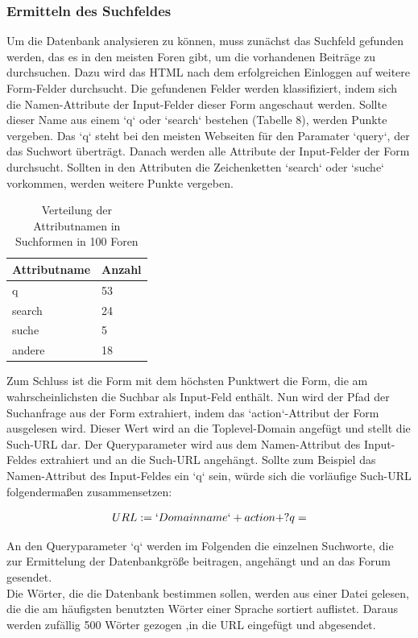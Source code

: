 \subsubsection{Ermitteln des Suchfeldes}
Um die Datenbank analysieren zu können, muss zunächst das Suchfeld gefunden werden, das es in den meisten Foren gibt, um die vorhandenen Beiträge zu durchsuchen.
Dazu wird das HTML nach dem erfolgreichen Einloggen auf weitere Form-Felder durchsucht. Die gefundenen Felder werden klassifiziert, indem sich die Namen-Attribute der Input-Felder dieser Form angeschaut werden. Sollte dieser Name aus einem `q` oder `search` bestehen (Tabelle 8), werden Punkte vergeben. Das `q` steht bei den meisten Webseiten für den Paramater `query`, der das Suchwort überträgt.
Danach werden alle Attribute der Input-Felder der Form durchsucht. Sollten in den Attributen die Zeichenketten `search` oder `suche` vorkommen, werden weitere Punkte vergeben.

\begin{table}[h!]
\centering 
\begin{tabular}{ | p{3cm} | p{3cm}|} \hline
\textbf{Attributname} & \textbf{Anzahl} \\ \hline
q & 53 \\ \hline
search & 24 \\ \hline
suche & 5 \\ \hline
andere & 18 \\ \hline
\end{tabular}
\caption{Verteilung der Attributnamen in Suchformen in 100 Foren}
\end{table}

Zum Schluss ist die Form mit dem höchsten Punktwert die Form, die am wahrscheinlichsten die Suchbar als Input-Feld enthält.
Nun wird der Pfad der Suchanfrage aus der Form extrahiert, indem das `action`-Attribut der Form ausgelesen wird. Dieser Wert wird an die Toplevel-Domain angefügt und stellt die Such-URL dar. Der Queryparameter wird aus dem Namen-Attribut des Input-Feldes extrahiert und an die Such-URL angehängt. Sollte zum Beispiel das Namen-Attribut des Input-Feldes ein `q` sein, würde sich die vorläufige Such-URL folgendermaßen zusammensetzen:

\[ URL := `Domainname` + action + ?q= \]

An den Queryparameter `q` werden im Folgenden die einzelnen Suchworte, die zur Ermittelung der Datenbankgröße beitragen, angehängt und an das Forum gesendet.\\
Die Wörter, die die Datenbank bestimmen sollen, werden aus einer Datei gelesen, die die am häufigsten benutzten Wörter einer Sprache sortiert auflistet. Daraus werden zufällig 500 Wörter gezogen ,in die URL eingefügt und abgesendet.

